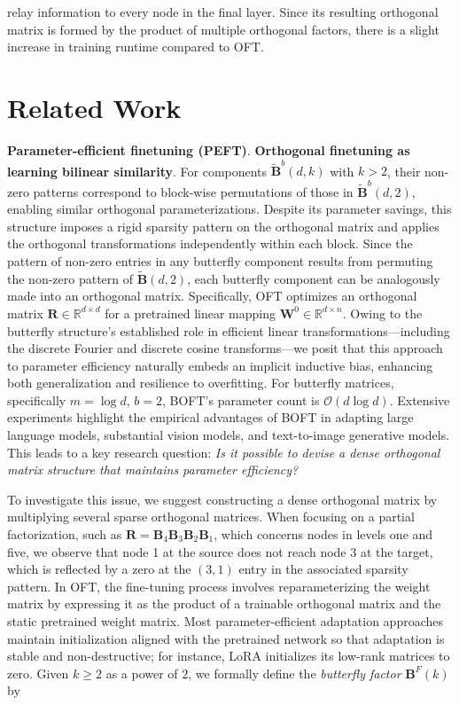 \begin{itemize}[leftmargin=*,nosep]
relay information to every node in the final layer. Since its resulting orthogonal matrix is formed by the product of multiple orthogonal factors, there is a slight increase in training runtime compared to OFT. \end{itemize}

\section{Related Work}

\textbf{Parameter-efficient finetuning (PEFT)}. \textbf{Orthogonal finetuning as learning bilinear similarity}. For components $\tilde{\bm{B}}^b(d,k)$ with $k>2$, their non-zero patterns correspond to block-wise permutations of those in $\tilde{\bm{B}}^b(d,2)$, enabling similar orthogonal parameterizations. Despite its parameter savings, this structure imposes a rigid sparsity pattern on the orthogonal matrix and applies the orthogonal transformations independently within each block. Since the pattern of non-zero entries in any butterfly component results from permuting the non-zero pattern of $\tilde{\bm{B}}(d,2)$, each butterfly component can be analogously made into an orthogonal matrix. Specifically, OFT optimizes an orthogonal matrix $\bm{R}\in\mathbb{R}^{d\times d}$ for a pretrained linear mapping $\bm{W}^0\in\mathbb{R}^{d\times n}$. Owing to the butterfly structure’s established role in efficient linear transformations—including the discrete Fourier and discrete cosine transforms—we posit that this approach to parameter efficiency naturally embeds an implicit inductive bias, enhancing both generalization and resilience to overfitting. For butterfly matrices, specifically $m = \log d$, $b = 2$, BOFT’s parameter count is $\mathcal{O}(d\log d)$. Extensive experiments highlight the empirical advantages of BOFT in adapting large language models, substantial vision models, and text-to-image generative models. This leads to a key research question: \emph{Is it possible to devise a dense orthogonal matrix structure that maintains parameter efficiency?}

To investigate this issue, we suggest constructing a dense orthogonal matrix by multiplying several sparse orthogonal matrices. When focusing on a partial factorization, such as $\bm{R}=\bm{B}_4\bm{B}_3\bm{B}_2\bm{B}_1$, which concerns nodes in levels one and five, we observe that node 1 at the source does not reach node 3 at the target, which is reflected by a zero at the $(3,1)$ entry in the associated sparsity pattern. In OFT, the fine-tuning process involves reparameterizing the weight matrix by expressing it as the product of a trainable orthogonal matrix and the static pretrained weight matrix. Most parameter-efficient adaptation approaches maintain initialization aligned with the pretrained network so that adaptation is stable and non-destructive; for instance, LoRA initializes its low-rank matrices to zero. Given $k \geq 2$ as a power of $2$, we formally define the \emph{butterfly factor} $\bm{B}^F(k)$ by

